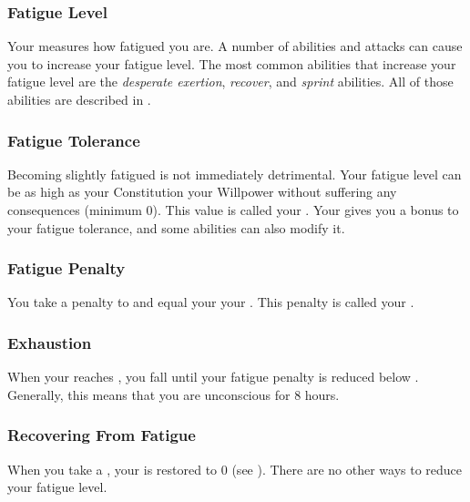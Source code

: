         \subsubsection{Fatigue Level}\label{Fatigue Level}
            Your  measures how fatigued you are.
            A number of abilities and attacks can cause you to increase your fatigue level.
            The most common abilities that increase your fatigue level are the \textit{desperate exertion}, \textit{recover}, and \textit{sprint} abilities.
            All of those abilities are described in .

            \subsubsection{Fatigue Tolerance}\label{Fatigue Tolerance}
                Becoming slightly fatigued is not immediately detrimental.
                Your fatigue level can be as high as your Constitution \add your Willpower without suffering any consequences (minimum 0).
                This value is called your .
                Your  gives you a bonus to your fatigue tolerance, and some abilities can also modify it.

            \subsubsection{Fatigue Penalty}\label{Fatigue Penalty}
                You take a penalty to  and  equal your  \sub your .
                This penalty is called your .

        \subsubsection{Exhaustion}\label{Exhaustion}
            When your  reaches , you fall \unconscious until your fatigue penalty is reduced below .
            Generally, this means that you are unconscious for 8 hours.

        \subsubsection{Recovering From Fatigue}
            When you take a , your  is restored to 0 (see ).
            There are no other ways to reduce your fatigue level.

